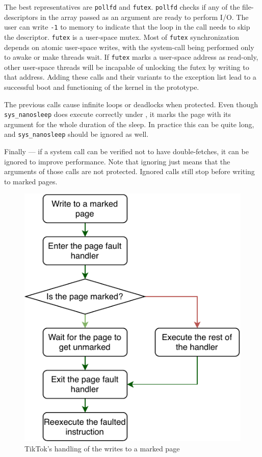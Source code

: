 The best representatives are \texttt{pollfd}\cite{pollfd} and
\texttt{futex}\cite{futex}. \texttt{pollfd} checks if any of the
file-descriptors in the array passed as an argument are ready to perform I/O.
The user can write \texttt{-1} to memory to indicate that the loop in the call
needs to skip the descriptor. \texttt{futex} is a user-space mutex. Most of
\texttt{futex} synchronization depends on atomic user-space writes, with the
system-call being performed only to awake or make threads wait. If
\texttt{futex} marks a user-space address as read-only, other user-space threads
will be incapable of unlocking the futex by writing to that address. Adding
these calls and their variants to the exception list lead to a successful boot
and functioning of the kernel in the prototype.

The previous calls cause infinite loops or deadlocks when protected. Even though
\texttt{sys\_nanosleep} does execute correctly under \sysname, it marks the page
with its argument for the whole duration of the sleep. In practice this can be
quite long, and \texttt{sys\_nanosleep} should be ignored as well.

Finally --- if a system call can be verified not to have double-fetches, it can
be ignored to improve performance. Note that ignoring just means that the
arguments of those calls are not protected. Ignored calls still stop before
writing to marked pages.


\begin{figure}[]
  \centering
  \includegraphics[width = .75 \linewidth]{img/pagefault.pdf}
  \caption{TikTok's handling of the writes to a marked page}
  \label{fig:pagefault}
\end{figure}

